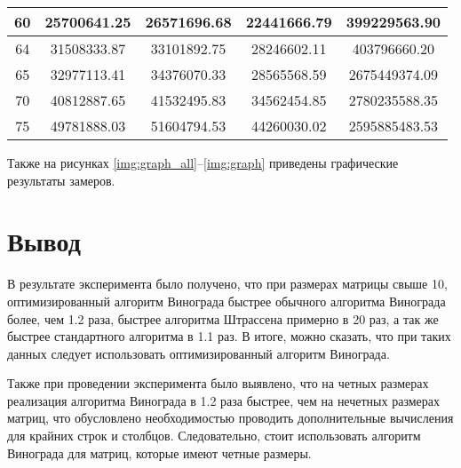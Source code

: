 \begin{table}[h]
\begin{center}
\begin{threeparttable}
\begin{tabular}{|c|c|c|c|c|}
            60 & 25700641.25 & 26571696.68 & 22441666.79 & 399229563.90 \\ 
            \hline
            64 & 31508333.87 & 33101892.75 & 28246602.11 & 403796660.20 \\ 
            \hline
            65 & 32977113.41 & 34376070.33 & 28565568.59 & 2675449374.09 \\ 
            \hline
            70 & 40812887.65 & 41532495.83 & 34562454.85 & 2780235588.35 \\ 
            \hline
            75 & 49781888.03 & 51604794.53 & 44260030.02 & 2595885483.53 \\ 
            \hline
		\end{tabular}
    \end{threeparttable}
\end{center}
\end{table}

\clearpage
Также на рисунках \ref{img:graph_all}--\ref{img:graph} приведены графические результаты замеров.

\clearpage


\section{Вывод}

В результате эксперимента было получено, что при размерах матрицы свыше 10, оптимизированный алгоритм Винограда быстрее обычного алгоритма Винограда более, чем 1.2 раза, быстрее алгоритма Штрассена примерно в 20 раз, а так же быстрее стандартного алгоритма в 1.1 раз. В итоге, можно сказать, что при таких данных следует использовать оптимизированный алгоритм Винограда.

Также при проведении эксперимента было выявлено, что на четных размерах реализация алгоритма Винограда в 1.2 раза быстрее, чем на нечетных размерах матриц, что обусловлено необходимостью проводить дополнительные вычисления для крайних строк и столбцов.  Следовательно, стоит использовать алгоритм Винограда для матриц, которые имеют четные размеры.